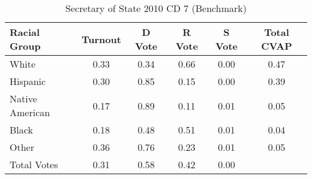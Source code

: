 \begin{table}[htb]
\begin{center}
\caption{Secretary of State 2010 CD 7 (Benchmark)}
\label{sos10_cvap_cd_7_benchmark}
\begin{tabular}{lccccc}
  \hline
Racial Group & Turnout & D Vote & R Vote & S Vote & Total CVAP \\ 
  \hline
White & 0.33 & 0.34 & 0.66 & 0.00 & 0.47 \\ 
  Hispanic & 0.30 & 0.85 & 0.15 & 0.00 & 0.39 \\ 
  Native American & 0.17 & 0.89 & 0.11 & 0.01 & 0.05 \\ 
  Black & 0.18 & 0.48 & 0.51 & 0.01 & 0.04 \\ 
  Other & 0.36 & 0.76 & 0.23 & 0.01 & 0.05 \\ 
  Total Votes & 0.31 & 0.58 & 0.42 & 0.00 &  \\ 
   \hline
\end{tabular}
\end{center}
\end{table}
